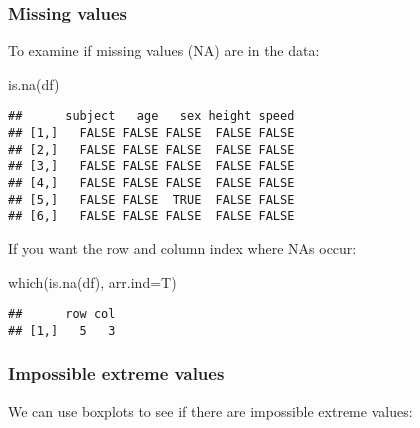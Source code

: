 \documentclass[
]{article}
\newenvironment{Shaded}{\begin{snugshade}}{\end{snugshade}}
\newcommand{\AttributeTok}[1]{\textcolor[rgb]{0.77,0.63,0.00}{#1}}
\newcommand{\FunctionTok}[1]{\textcolor[rgb]{0.00,0.00,0.00}{#1}}
\newcommand{\NormalTok}[1]{#1}
\begin{document}
\hypertarget{missing-values}{%
\subsubsection{Missing values}\label{missing-values}}

To examine if missing values (NA) are in the data:

\begin{Shaded}
\begin{Highlighting}[]
\FunctionTok{is.na}\NormalTok{(df)}
\end{Highlighting}
\end{Shaded}

\begin{verbatim}
##      subject   age   sex height speed
## [1,]   FALSE FALSE FALSE  FALSE FALSE
## [2,]   FALSE FALSE FALSE  FALSE FALSE
## [3,]   FALSE FALSE FALSE  FALSE FALSE
## [4,]   FALSE FALSE FALSE  FALSE FALSE
## [5,]   FALSE FALSE  TRUE  FALSE FALSE
## [6,]   FALSE FALSE FALSE  FALSE FALSE
\end{verbatim}

If you want the row and column index where NAs occur:

\begin{Shaded}
\begin{Highlighting}[]
\FunctionTok{which}\NormalTok{(}\FunctionTok{is.na}\NormalTok{(df), }\AttributeTok{arr.ind=}\NormalTok{T)}
\end{Highlighting}
\end{Shaded}

\begin{verbatim}
##      row col
## [1,]   5   3
\end{verbatim}

\hypertarget{impossible-extreme-values}{%
\subsubsection{Impossible extreme
values}\label{impossible-extreme-values}}

We can use boxplots to see if there are impossible extreme values:
\end{document}
